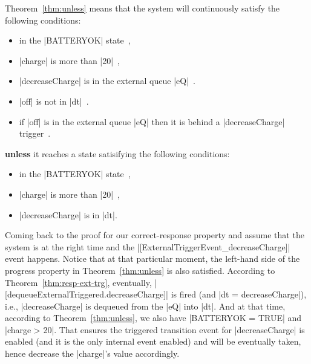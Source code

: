 Theorem~\ref{thm:unless} means that the system will continuously
satisfy the following conditions:
\begin{itemize}
\item in the |BATTERYOK| state~,
  
\item |charge| is more than |20|~,
  
\item |decreaseCharge| is in the external queue |eQ|~.
  
\item |off| is not in |dt|~.
  
\item if |off| is in the external queue |eQ| then it is behind a
  |decreaseCharge| trigger~.
\end{itemize}
\textbf{unless} it reaches a state satisifying the following conditions:
\begin{itemize}
\item in the |BATTERYOK| state~,
  
\item |charge| is more than |20|~,
  
\item |decreaseCharge| is in |dt|.
\end{itemize}

Coming back to the proof for our correct-response property and assume
that the system is at the right time and the
|[ExternalTriggerEvent_decreaseCharge]| event happens.  Notice that at
that particular moment, the left-hand side of the progress property in
Theorem~\ref{thm:unless} is also satisfied.  According to
Theorem~\ref{thm:resp-ext-trg}, eventually,
|[dequeueExternalTriggered.decreaseCharge]| is fired (and %
|dt = {decreaseCharge}|), %
i.e., |decreaseCharge| is dequeued from the |eQ| into |dt|. And at
that time, according to Theorem~\ref{thm:unless}, we also have
|BATTERYOK = TRUE| and |charge > 20|.  That ensures the triggered
transition event for |decreaseCharge| is enabled (and it is the only
internal event enabled) and will be eventually taken, hence decrease
the |charge|'s value accordingly.



